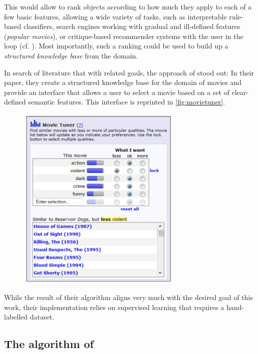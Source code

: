 This would allow to rank objects according to how much they apply to each of a few basic features, allowing a wide variety of tasks, such as interpretable rule-based classifiers, search engines working with gradual and ill-defined features (\eg \textit{popular movies}), or critique-based recommender systems with the user in the loop (cf. \cite{Ager2018}). Most importantly, such a ranking could be used to build up a \textit{structured knowledge base} from the domain.

In search of literature that with related goals, the approach of \cite{VISR12} stood out: In their paper, they create a structured knowledge base for the domain of movies and provide an interface that allows a user to select a movie based on a set of clear-defined semantic features. This interface is reprinted in \autoref{fig:movietuner}.


\begin{figure}[H]
	\centering
	\includegraphics[width=0.7\textwidth]{graphics/stolenfigures/movietuner.png}
\end{figure}

While the result of their algorithm aligns very much with the desired goal of this work, their implementation relies on supervised learning that requires a hand-labelled dataset.

\subsection{The algorithm of \textcite{Derrac2015}}

